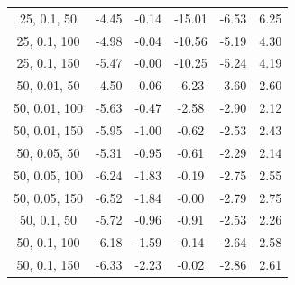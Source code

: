 \documentclass[
]{article}
\begin{document}
\begin{table}[H]
{\begin{tabular}{|c|c|c|c|c|c|}
                25, 0.1, 50                & -4.45                      & -0.14                      & -15.01                     & -6.53                    & 6.25                    \\
                25, 0.1, 100               & -4.98                      & -0.04                      & -10.56                     & -5.19                    & 4.30                    \\
                25, 0.1, 150               & -5.47                      & -0.00                      & -10.25                     & -5.24                    & 4.19                    \\
                50, 0.01, 50               & -4.50                      & -0.06                      & -6.23                      & -3.60                    & 2.60                    \\
                50, 0.01, 100              & -5.63                      & -0.47                      & -2.58                      & -2.90                    & 2.12                    \\
                50, 0.01, 150              & -5.95                      & -1.00                      & -0.62                      & -2.53                    & 2.43                    \\
                50, 0.05, 50               & -5.31                      & -0.95                      & -0.61                      & -2.29                    & 2.14                    \\
                50, 0.05, 100              & -6.24                      & -1.83                      & -0.19                      & -2.75                    & 2.55                    \\
                50, 0.05, 150              & -6.52                      & -1.84                      & -0.00                      & -2.79                    & 2.75                    \\
                50, 0.1, 50                & -5.72                      & -0.96                      & -0.91                      & -2.53                    & 2.26                    \\
                50, 0.1, 100               & -6.18                      & -1.59                      & -0.14                      & -2.64                    & 2.58                    \\
                50, 0.1, 150               & -6.33                      & -2.23                      & -0.02                      & -2.86                    & 2.61                    \\

\end{tabular}}
\end{table}
\end{document}
